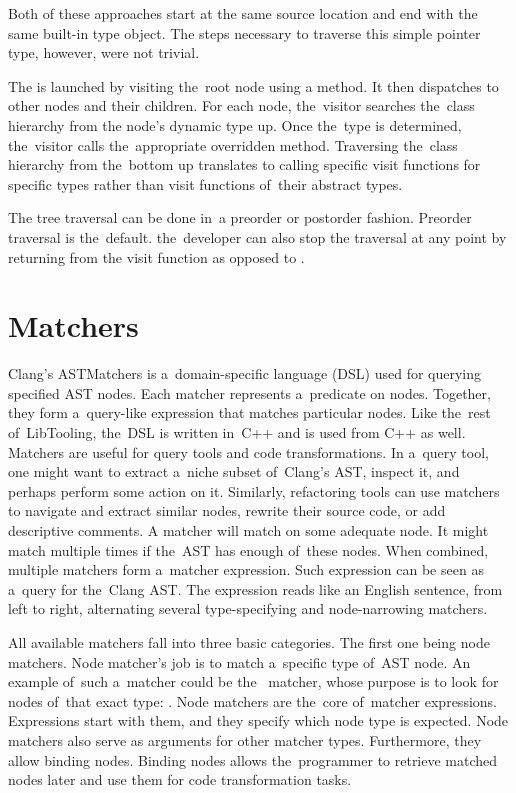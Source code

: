 Both of these approaches start at the same source location and end 
with the same built-in type object. 
The steps necessary to traverse this simple pointer type, however, 
were not trivial.

The  is launched by visiting the~root node using 
a  method. 
It then dispatches to other nodes and their children. 
For each node, the~visitor searches the~class hierarchy from 
the node's dynamic type up. 
Once the~type is determined, the~visitor calls the~appropriate 
overridden  method. 
Traversing the~class hierarchy from the~bottom up 
translates to calling specific visit functions for specific types 
rather than visit functions of~their abstract types.

The tree traversal can be done in~a preorder or postorder fashion. 
Preorder traversal is the~default. the~developer can also stop
the traversal at any point by returning  from
the visit function as opposed to .

\section{Matchers}

Clang's ASTMatchers \citep{matchers:online} 
is a~domain-specific language (DSL) used for querying 
specified AST nodes. 
Each matcher represents a~predicate on nodes. 
Together, they form a~query-like expression that matches particular nodes. 
Like the~rest of~LibTooling, the~DSL is written in~C++ and is used from 
C++ as well.
Matchers are useful for query tools and code transformations. 
In a~query tool, one might want to extract a~niche subset of~Clang's AST, 
inspect it, and perhaps perform some action on it. 
Similarly, refactoring tools can use matchers to navigate and extract 
similar nodes, rewrite their source code, or add descriptive comments.
A matcher will match on some adequate node. 
It might match multiple times if the~AST has enough of~these nodes. 
When combined, multiple matchers form a~matcher expression. 
Such expression can be seen as a~query for the~Clang AST. 
The expression reads like an English sentence, from left to right, 
alternating several type-specifying and node-narrowing matchers.

All available matchers fall into three basic categories. 
The first one being node matchers. 
Node matcher's job is to match a~specific type of~AST node. 
An example of~such a~matcher could be the~ 
matcher, whose purpose is to look for nodes of~that exact 
type: . 
Node matchers are the~core of~matcher expressions. 
Expressions start with them, and they specify which node type is expected. 
Node matchers also serve as arguments for other matcher types. 
Furthermore, they allow binding nodes. 
Binding nodes allows the~programmer to retrieve matched nodes later and 
use them for code transformation tasks. 

